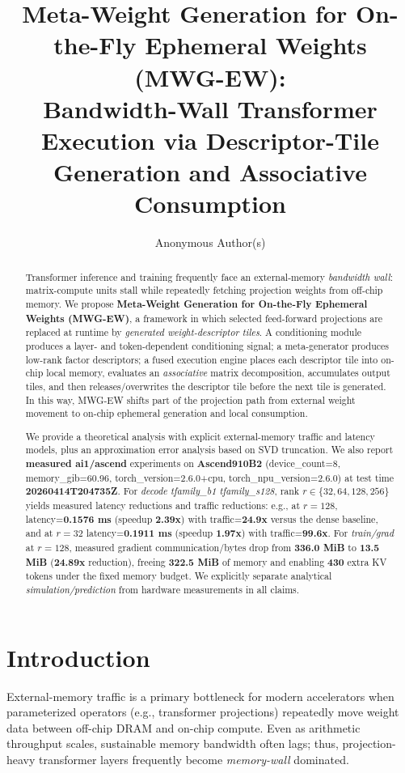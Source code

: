 \documentclass[11pt]{article}
\title{Meta-Weight Generation for On-the-Fly Ephemeral Weights (MWG-EW):\\ Bandwidth-Wall Transformer Execution via Descriptor-Tile Generation and Associative Consumption}
\author{Anonymous Author(s)}
\date{}
\begin{document}
\maketitle

\begin{abstract}
Transformer inference and training frequently face an external-memory \emph{bandwidth wall}: matrix-compute units stall while repeatedly fetching projection weights from off-chip memory. We propose \textbf{Meta-Weight Generation for On-the-Fly Ephemeral Weights (MWG-EW)}, a framework in which selected feed-forward projections are replaced at runtime by \emph{generated weight-descriptor tiles}. A conditioning module produces a layer- and token-dependent conditioning signal; a meta-generator produces low-rank factor descriptors; a fused execution engine places each descriptor tile into on-chip local memory, evaluates an \emph{associative} matrix decomposition, accumulates output tiles, and then releases/overwrites the descriptor tile before the next tile is generated. In this way, MWG-EW shifts part of the projection path from external weight movement to on-chip ephemeral generation and local consumption.

We provide a theoretical analysis with explicit external-memory traffic and latency models, plus an approximation error analysis based on SVD truncation. We also report \textbf{measured ai1/ascend} experiments on \textbf{Ascend910B2} (device\_count=8, memory\_gib=60.96, torch\_version=2.6.0+cpu, torch\_npu_version=2.6.0) at test time \textbf{20260414T204735Z}. For \emph{decode	tfamily\_b1	tfamily\_s128}, rank $r\in\{32,64,128,256\}$ yields measured latency reductions and traffic reductions: e.g., at $r=128$, latency=\textbf{0.1576 ms} (speedup \textbf{2.39x}) with traffic=\textbf{24.9x} versus the dense baseline, and at $r=32$ latency=\textbf{0.1911 ms} (speedup \textbf{1.97x}) with traffic=\textbf{99.6x}. For \emph{train/grad} at $r=128$, measured gradient communication/bytes drop from \textbf{336.0 MiB} to \textbf{13.5 MiB} (\textbf{24.89x} reduction), freeing \textbf{322.5 MiB} of memory and enabling \textbf{430} extra KV tokens under the fixed memory budget. We explicitly separate analytical \emph{simulation/prediction} from hardware measurements in all claims.

\end{abstract}

\section{Introduction}
External-memory traffic is a primary bottleneck for modern accelerators when parameterized operators (e.g., transformer projections) repeatedly move weight data between off-chip DRAM and on-chip compute. Even as arithmetic throughput scales, sustainable memory bandwidth often lags; thus, projection-heavy transformer layers frequently become \emph{memory-wall} dominated.
\end{document}

